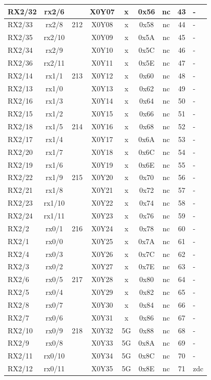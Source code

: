 \begin{longtable}{|l|c|c|c|c|c|c|c|l|}
RX2/32 & rx2/6  &     & X0Y07 &  x  & 0x56 & nc & 43 & -\\\hline   
RX2/33 & rx2/8  & 212 & X0Y08 &  x  & 0x58 & nc & 44 & -\\\hline   
RX2/35 & rx2/10 &     & X0Y09 &  x  & 0x5A & nc & 45 & -\\\hline   
RX2/34 & rx2/9  &     & X0Y10 &  x  & 0x5C & nc & 46 & -\\\hline   
RX2/36 & rx2/11 &     & X0Y11 &  x  & 0x5E & nc & 47 & -\\\hline   
RX2/14 & rx1/1  & 213 & X0Y12 &  x  & 0x60 & nc & 48 & -\\\hline   
RX2/13 & rx1/0  &     & X0Y13 &  x  & 0x62 & nc & 49 & -\\\hline   
RX2/16 & rx1/3  &     & X0Y14 &  x  & 0x64 & nc & 50 & -\\\hline   
RX2/15 & rx1/2  &     & X0Y15 &  x  & 0x66 & nc & 51 & -\\\hline   
RX2/18 & rx1/5  & 214 & X0Y16 &  x  & 0x68 & nc & 52 & -\\\hline   
RX2/17 & rx1/4  &     & X0Y17 &  x  & 0x6A & nc & 53 & -\\\hline   
RX2/20 & rx1/7  &     & X0Y18 &  x  & 0x6C & nc & 54 & -\\\hline   
RX2/19 & rx1/6  &     & X0Y19 &  x  & 0x6E & nc & 55 & -\\\hline   
RX2/22 & rx1/9  & 215 & X0Y20 &  x  & 0x70 & nc & 56 & -\\\hline   
RX2/21 & rx1/8  &     & X0Y21 &  x  & 0x72 & nc & 57 & -\\\hline   
RX2/23 & rx1/10 &     & X0Y22 &  x  & 0x74 & nc & 58 & -\\\hline   
RX2/24 & rx1/11 &     & X0Y23 &  x  & 0x76 & nc & 59 & -\\\hline   
RX2/2  & rx0/1  & 216 & X0Y24 &  x  & 0x78 & nc & 60 & -\\\hline   
RX2/1  & rx0/0  &     & X0Y25 &  x  & 0x7A & nc & 61 & -\\\hline   
RX2/4  & rx0/3  &     & X0Y26 &  x  & 0x7C & nc & 62 & -\\\hline   
RX2/3  & rx0/2  &     & X0Y27 &  x  & 0x7E & nc & 63 & -\\\hline   
RX2/6  & rx0/5  & 217 & X0Y28 &  x  & 0x80 & nc & 64 & -\\\hline   
RX2/5  & rx0/4  &     & X0Y29 &  x  & 0x82 & nc & 65 & -\\\hline   
RX2/8  & rx0/7  &     & X0Y30 &  x  & 0x84 & nc & 66 & -\\\hline   
RX2/7  & rx0/6  &     & X0Y31 &  x  & 0x86 & nc & 67 & -\\\hline   
RX2/10 & rx0/9  & 218 & X0Y32 &  5G & 0x88 & nc & 68 & -\\\hline   
RX2/9  & rx0/8  &     & X0Y33 &  5G & 0x8A & nc & 69 & -\\\hline   
RX2/11 & rx0/10 &     & X0Y34 &  5G & 0x8C & nc & 70 & -\\\hline   
RX2/12 & rx0/11 &     & X0Y35 &  5G & 0x8E & nc & 71 & zdc\\\hline   
\end{longtable}                  

